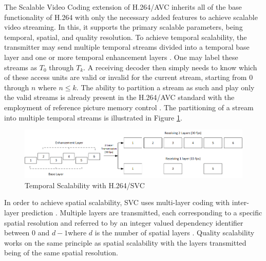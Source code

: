 \documentclass[a4paper,12pt]{article}
\begin{document}
The Scalable Video Coding extension of H.264/AVC inherits all of the base functionality of H.264 with only the necessary added features to achieve scalable video streaming. In this, it supports the primary scalable parameters, being temporal, spatial, and quality resolution. To achieve temporal scalability, the transmitter may send multiple temporal streams divided into a temporal base layer and one or more temporal enhancement layers \cite{SVCOverview}. One may label these streams as $T_0$ through $T_k$. A receiving decoder then simply needs to know which of these access units are valid or invalid for the current stream, starting from $0$ through $n$ where $n\le{k}$. The ability to partition a stream as such and play only the valid streams is already present in the H.264/AVC standard with the employment of reference picture memory control \cite{SVCOverview}. The partitioning of a stream into multiple temporal streams is illustrated in Figure \ref{fig:SVCTemporalScaling}.
\begin{figure}[h]
\centering
\includegraphics[width=0.8\linewidth]{SVCTemporalScalability.png}
\caption{Temporal Scalability with H.264/SVC \cite{SVCOverview}}
\label{fig:SVCTemporalScaling}
\end{figure}
In order to achieve spatial scalability, SVC uses multi-layer coding with inter-layer prediction \cite{SVCOverview}. Multiple layers are transmitted, each corresponding to a specific spatial resolution and referred to by an integer valued dependency identifier between $0$ and $d-1 $where $d$ is the number of spatial layers \cite{SVCOverview}. Quality scalability works on the same principle as spatial scalability with the layers transmitted being of the same spatial resolution. 
\end{document}
